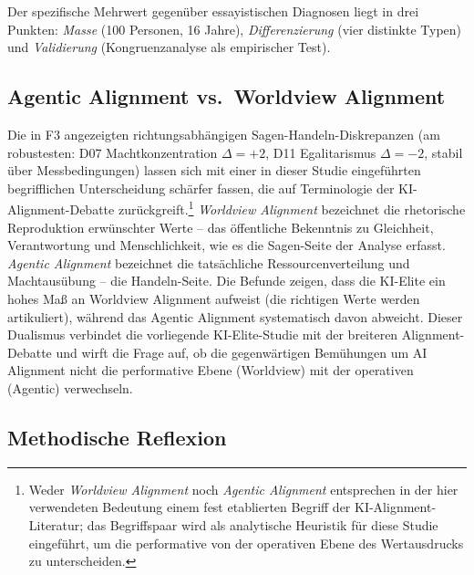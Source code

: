 \documentclass[12pt,a4paper]{article}
\begin{document}
Der spezifische Mehrwert gegen\"uber essayistischen Diagnosen liegt in drei Punkten: \emph{Masse} (100 Personen, 16 Jahre), \emph{Differenzierung} (vier distinkte Typen) und \emph{Validierung} (Kongruenzanalyse als empirischer Test).


\subsection{Agentic Alignment vs.\ Worldview Alignment}
\label{sec:diskussion:alignment}

Die in F3 angezeigten richtungsabh\"angigen Sagen-Handeln-Diskrepanzen (am robustesten: D07 Machtkonzentration $\Delta = +2$, D11 Egalitarismus $\Delta = -2$, stabil \"uber Messbedingungen) lassen sich mit einer in dieser Studie eingef\"uhrten begrifflichen Unterscheidung sch\"arfer fassen, die auf Terminologie der KI-Alignment-Debatte zur\"uckgreift.\footnote{Weder \emph{Worldview Alignment} noch \emph{Agentic Alignment} entsprechen in der hier verwendeten Bedeutung einem fest etablierten Begriff der KI-Alignment-Literatur; das Begriffspaar wird als analytische Heuristik f\"ur diese Studie eingef\"uhrt, um die performative von der operativen Ebene des Wertausdrucks zu unterscheiden.} \emph{Worldview Alignment} bezeichnet die rhetorische Reproduktion erw\"unschter Werte -- das \"offentliche Bekenntnis zu Gleichheit, Verantwortung und Menschlichkeit, wie es die \glqq Sagen\grqq-Seite der Analyse erfasst. \emph{Agentic Alignment} bezeichnet die tats\"achliche Ressourcenverteilung und Macht\-aus\"ubung -- die \glqq Handeln\grqq-Seite. Die Befunde zeigen, dass die KI-Elite ein hohes Ma\ss{} an Worldview Alignment aufweist (die \glqq richtigen\grqq{} Werte werden artikuliert), w\"ahrend das Agentic Alignment systematisch davon abweicht. Dieser Dualismus verbindet die vorliegende KI-Elite-Studie mit der breiteren Alignment-Debatte und wirft die Frage auf, ob die gegenw\"artigen Bem\"uhungen um \glqq AI Alignment\grqq{} nicht die performative Ebene (Worldview) mit der operativen (Agentic) verwechseln.


\subsection{Methodische Reflexion}
\label{sec:diskussion:methodik}
\end{document}
